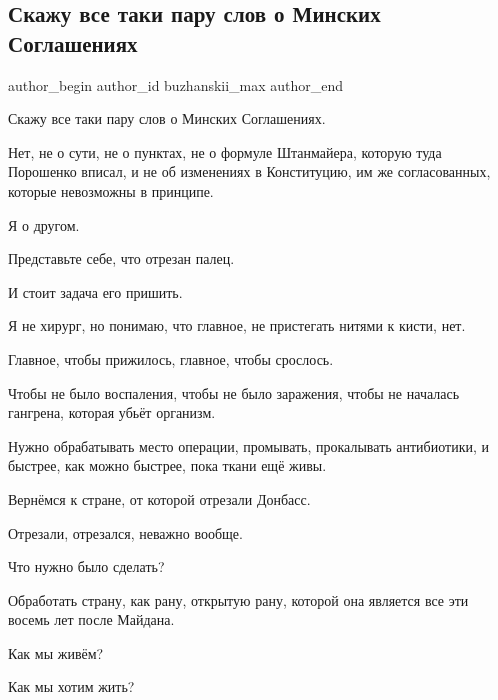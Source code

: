  
 
 
 
 
 
\subsection{Скажу все таки пару слов о Минских Соглашениях}
\label{sec:29_01_2022.fb.buzhanskii_max.1.minsk_soglashenia}
 
\ifcmt
 author_begin
   author_id buzhanskii_max
 author_end
\fi


Скажу все таки пару слов о Минских Соглашениях.

Нет, не о сути, не о пунктах, не о формуле Штанмайера, которую туда Порошенко
вписал, и не об изменениях в Конституцию, им же согласованных, которые
невозможны в принципе.

Я о другом.

Представьте себе, что отрезан палец.

И стоит задача его пришить.

Я не хирург, но понимаю, что главное, не пристегать нитями к кисти, нет.

Главное, чтобы прижилось, главное, чтобы срослось.

Чтобы не было воспаления, чтобы не было заражения, чтобы не началась гангрена,
которая убьёт организм.

Нужно обрабатывать место операции, промывать, прокалывать антибиотики, и
быстрее, как можно быстрее, пока ткани ещё живы.

Вернёмся к стране, от которой отрезали Донбасс.

Отрезали, отрезался, неважно вообще.

Что нужно было сделать?

Обработать страну, как рану,  открытую рану, которой она является все эти
восемь лет после Майдана.

Как мы живём?

Как мы хотим жить?

